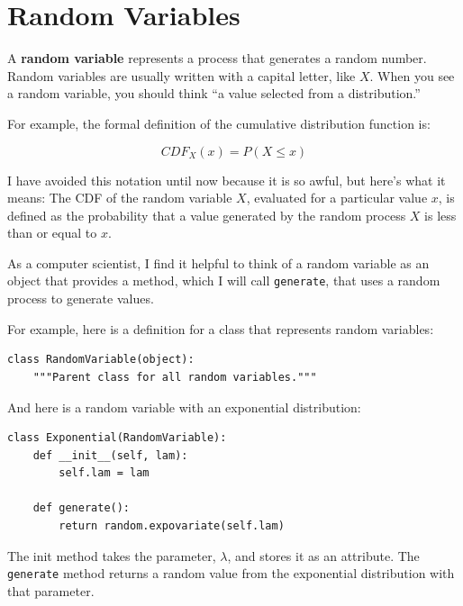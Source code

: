 \documentclass[12pt]{book}
\begin{document}
\section{Random Variables}

A {\bf random variable} represents a process that generates a random
number.  Random variables are usually written with a capital letter,
like $X$.  When you see a random variable, you should think ``a value
selected from a distribution.''


For example, the formal definition of the cumulative distribution
function is:

\[ CDF_X (x) = P(X \le x) \]

I have avoided this notation until now because it is so awful, but
here's what it means: The CDF of the random variable $X$, evaluated
for a particular value $x$, is defined as the probability that
a value generated by the random process $X$ is less than or equal
to $x$.

As a computer scientist, I find it helpful to think of a random
variable as an object that provides a method, which I will call
{\tt generate}, that uses a random process to generate values.

For example, here is a definition for a class that represents
random variables:

\begin{verbatim}
class RandomVariable(object):
    """Parent class for all random variables."""
\end{verbatim}

And here is a random variable with an exponential distribution:


\begin{verbatim}
class Exponential(RandomVariable):
    def __init__(self, lam):
        self.lam = lam

    def generate():
        return random.expovariate(self.lam)
\end{verbatim}

The init method takes the parameter, $\lambda$, and stores it as
an attribute.  The {\tt generate} method returns a random value
from the exponential distribution with that parameter.

\end{document}
